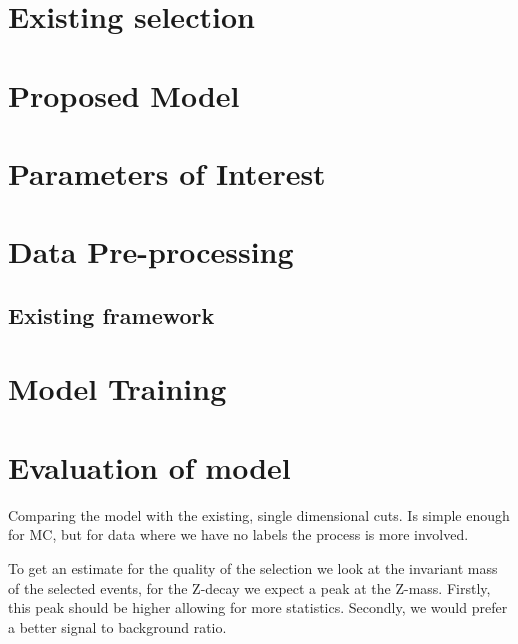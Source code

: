 \documentclass{tufte-book}
\begin{document}
\section{Existing selection}
\section{Proposed Model}
\section{Parameters of Interest}
\section{Data Pre-processing}

\subsection{Existing framework}

\section{Model Training}




\section{Evaluation of model}
Comparing the model with the existing, single dimensional cuts. Is simple enough for MC, but for data where we have no labels the process is more involved.

To get an estimate for the quality of the selection we look at the invariant mass of the selected events, for the Z-decay we expect a peak at the Z-mass. Firstly, this peak should be higher allowing for more statistics. Secondly, we would prefer a better signal to background ratio.
\end{document}

